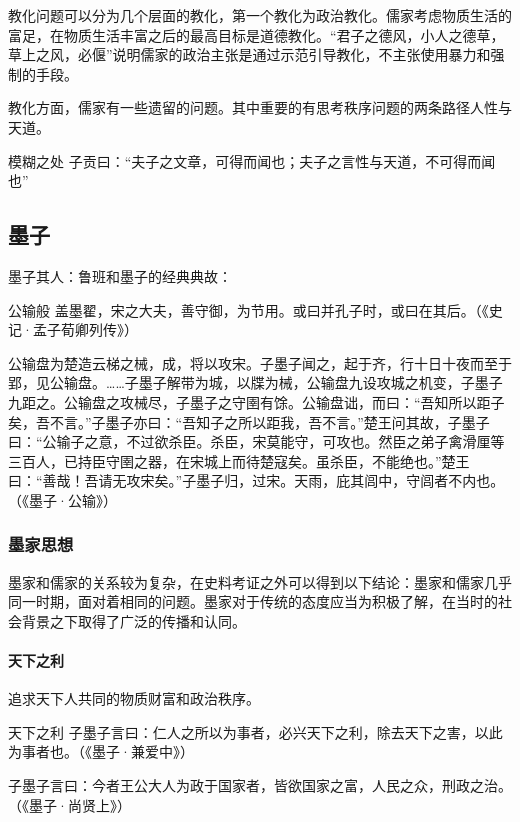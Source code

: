 教化问题可以分为几个层面的教化，第一个教化为政治教化。儒家考虑物质生活的富足，在物质生活丰富之后的最高目标是道德教化。“君子之德风，小人之德草，草上之风，必偃”说明儒家的政治主张是通过示范引导教化，不主张使用暴力和强制的手段。

教化方面，儒家有一些遗留的问题。其中重要的有思考秩序问题的两条路径人性与天道。

\begin{fancybox}{模糊之处}
    子贡曰：“夫子之文章，可得而闻也；夫子之言性与天道，不可得而闻也”
\end{fancybox}

\subsection{墨子}

墨子其人：鲁班和墨子的经典典故：

\begin{fancybox}{公输般}
    盖墨翟，宋之大夫，善守御，为节用。或曰并孔子时，或曰在其后。（《史记·孟子荀卿列传》）

    公输盘为楚造云梯之械，成，将以攻宋。子墨子闻之，起于齐，行十日十夜而至于郢，见公输盘。……子墨子解带为城，以牒为械，公输盘九设攻城之机变，子墨子九距之。公输盘之攻械尽，子墨子之守圉有馀。公输盘诎，而曰：“吾知所以距子矣，吾不言。”子墨子亦曰：“吾知子之所以距我，吾不言。”楚王问其故，子墨子曰：“公输子之意，不过欲杀臣。杀臣，宋莫能守，可攻也。然臣之弟子禽滑厘等三百人，已持臣守圉之器，在宋城上而待楚寇矣。虽杀臣，不能绝也。”楚王曰：“善哉！吾请无攻宋矣。”子墨子归，过宋。天雨，庇其闾中，守闾者不内也。（《墨子·公输》）
\end{fancybox}

\subsubsection{墨家思想}

墨家和儒家的关系较为复杂，在史料考证之外可以得到以下结论：墨家和儒家几乎同一时期，面对着相同的问题。墨家对于传统的态度应当为积极了解，在当时的社会背景之下取得了广泛的传播和认同。

\paragraph{天下之利}

追求天下人共同的物质财富和政治秩序。

\begin{fancybox}{天下之利}
子墨子言曰：仁人之所以为事者，必兴天下之利，除去天下之害，以此为事者也。（《墨子·兼爱中》）

子墨子言曰：今者王公大人为政于国家者，皆欲国家之富，人民之众，刑政之治。 （《墨子·尚贤上》）    
\end{fancybox}

